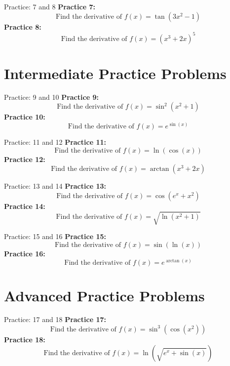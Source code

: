 \documentclass[aspectratio=169]{beamer}
\begin{document}
\begin{frame}{Practice: 7 and 8}
\textbf{Practice 7:}
\[
\text{Find the derivative of } f(x) = \tan(3x^2 - 1)
\]
\vspace{1em}
\textbf{Practice 8:}
\[
\text{Find the derivative of } f(x) = (x^3 + 2x)^5
\]
\end{frame}

\section{Intermediate Practice Problems}

\begin{frame}{Practice: 9 and 10}
\textbf{Practice 9:}
\[
\text{Find the derivative of } f(x) = \sin^2(x^2 + 1)
\]
\vspace{1em}
\textbf{Practice 10:}
\[
\text{Find the derivative of } f(x) = e^{\sin(x)}
\]
\end{frame}

\begin{frame}{Practice: 11 and 12}
\textbf{Practice 11:}
\[
\text{Find the derivative of } f(x) = \ln(\cos(x))
\]
\vspace{1em}
\textbf{Practice 12:}
\[
\text{Find the derivative of } f(x) = \arctan(x^3 + 2x)
\]
\end{frame}

\begin{frame}{Practice: 13 and 14}
\textbf{Practice 13:}
\[
\text{Find the derivative of } f(x) = \cos(e^x + x^2)
\]
\vspace{1em}
\textbf{Practice 14:}
\[
\text{Find the derivative of } f(x) = \sqrt{\ln(x^2 + 1)}
\]
\end{frame}

\begin{frame}{Practice: 15 and 16}
\textbf{Practice 15:}
\[
\text{Find the derivative of } f(x) = \sin(\ln(x))
\]
\vspace{1em}
\textbf{Practice 16:}
\[
\text{Find the derivative of } f(x) = e^{\arctan(x)}
\]
\end{frame}

\section{Advanced Practice Problems}

\begin{frame}{Practice: 17 and 18}
\textbf{Practice 17:}
\[
\text{Find the derivative of } f(x) = \sin^3(\cos(x^2))
\]
\vspace{1em}
\textbf{Practice 18:}
\[
\text{Find the derivative of } f(x) = \ln(\sqrt{e^x + \sin(x)})
\]
\end{frame}
\end{document}
